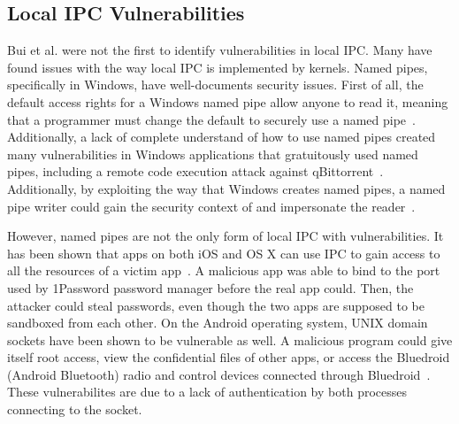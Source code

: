 \subsection{Local IPC Vulnerabilities}
Bui et al. were not the first to identify vulnerabilities in local IPC.  Many have found issues with the way local IPC is implemented by kernels.  Named pipes, specifically in Windows, have well-documents security issues.  First of all, the default access rights for a Windows named pipe allow anyone to read it, meaning that a programmer must change the default to securely use a named pipe~\cite{microsoft_2018}.  Additionally, a lack of complete understand of how to use named pipes created many vulnerabilities in Windows applications that gratuitously used named pipes, including a remote code execution attack against qBittorrent~\cite{cohen_2019}.  Additionally, by exploiting the way that Windows creates named pipes, a named pipe writer could gain the security context of and impersonate the reader~\cite{watts2002discovering}.

However, named pipes are not the only form of local IPC with vulnerabilities.  It has been shown that apps on both iOS and OS X can use IPC to gain access to all the resources of a victim app~\cite{Xing_2015_CAI_2810103_2813609}.  A malicious app was able to bind to the port used by 1Password password manager before the real app could.  Then, the attacker could steal passwords, even though the two apps are supposed to be sandboxed from each other.  On the Android operating system, UNIX domain sockets have been shown to be vulnerable as well.  A malicious program could give itself root access, view the confidential files of other apps, or access the Bluedroid (Android Bluetooth) radio and control devices connected through Bluedroid~\cite{Shao_2016_MAU_2976749_2978297}.  These vulnerabilites are due to a lack of authentication by both processes connecting to the socket.